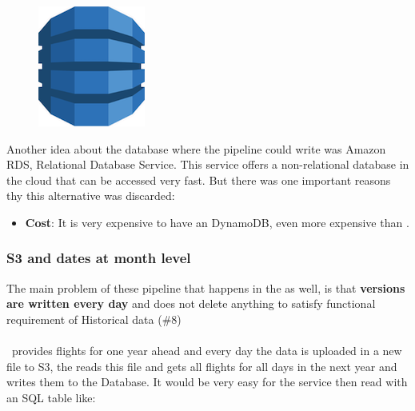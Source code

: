 \begin{figure}[H]
\includegraphics[scale=0.2]{resources/dynamodb-logo.png}
\end{figure}

Another idea about the database where the pipeline could write was Amazon RDS, Relational Database Service\cite{dynamodb}. This service offers a non-relational database in the cloud that can be accessed very fast. But there was one important reasons thy this alternative was discarded:

\begin{itemize}
    \item \textbf{Cost}: It is very expensive to have an DynamoDB, even more expensive than .
\end{itemize}

\subsubsection{S3 and dates at month level} \label{month_version}

The main problem of these pipeline that happens in the  as well, is that \textbf{versions are written every day} and does not delete anything to satisfy functional requirement of Historical data (\#8)
\\\\
\squad\ provides flights for one year ahead and every day the data is uploaded in a new file to S3, the  reads this file and gets all flights for all days in the next year and writes them to the Database. It would be very easy for the service then read with an SQL table like:

